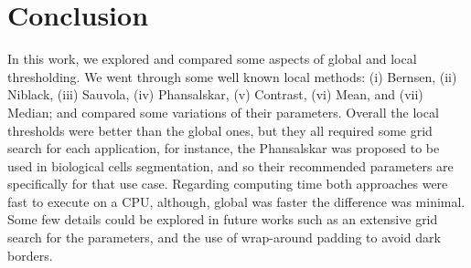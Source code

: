 \documentclass[conference]{IEEEtran}
\begin{document}
\section{Conclusion}
\label{sec:conclusion}
In this work, we explored and compared some aspects of global and local thresholding. We went through some well known local methods: (i) Bernsen, (ii) Niblack, (iii) Sauvola, (iv) Phansalskar, (v) Contrast, (vi) Mean, and (vii) Median; and compared some variations of their parameters. Overall the local thresholds were better than the global ones, but they all required some grid search for each application, for instance, the Phansalskar was proposed to be used in biological cells segmentation, and so their recommended parameters are specifically for that use case. Regarding computing time both approaches were fast to execute on a CPU, although, global was faster the difference was minimal. Some few details could be explored in future works such as an extensive grid search for the parameters, and the use of wrap-around padding to avoid dark borders.
\end{document}
